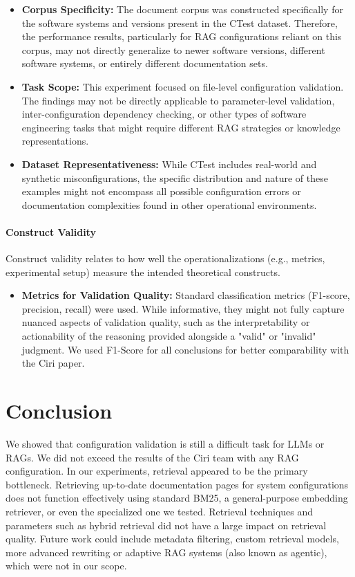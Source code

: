 \begin{itemize}
    \item \textbf{Corpus Specificity:} The document corpus was constructed specifically for the software systems and versions present in the CTest dataset. Therefore, the performance results, particularly for RAG configurations reliant on this corpus, may not directly generalize to newer software versions, different software systems, or entirely different documentation sets.
    \item \textbf{Task Scope:} This experiment focused on file-level configuration validation. The findings may not be directly applicable to parameter-level validation, inter-configuration dependency checking, or other types of software engineering tasks that might require different RAG strategies or knowledge representations.
    \item \textbf{Dataset Representativeness:} While CTest includes real-world and synthetic misconfigurations, the specific distribution and nature of these examples might not encompass all possible configuration errors or documentation complexities found in other operational environments.
\end{itemize}

\paragraph{Construct Validity}
Construct validity relates to how well the operationalizations (e.g., metrics, experimental setup) measure the intended theoretical constructs.
\begin{itemize}
   \item \textbf{Metrics for Validation Quality:} Standard classification metrics (F1-score, precision, recall) were used. While informative, they might not fully capture nuanced aspects of validation quality, such as the interpretability or actionability of the reasoning provided alongside a "valid" or "invalid" judgment. We used F1-Score for all conclusions for better comparability with the Ciri paper.
\end{itemize}

\section{Conclusion} \label{sec:exp_conclusion}

We showed that configuration validation is still a difficult task for LLMs or RAGs. We did not exceed the results of the Ciri team with any RAG configuration. In our experiments, retrieval appeared to be the primary bottleneck. Retrieving up-to-date documentation pages for system configurations does not function effectively using standard BM25, a general-purpose embedding retriever, or even the specialized one we tested. Retrieval techniques and parameters such as hybrid retrieval did not have a large impact on retrieval quality. Future work could include metadata filtering, custom retrieval models, more advanced rewriting or adaptive RAG systems (also known as agentic), which were not in our scope.

